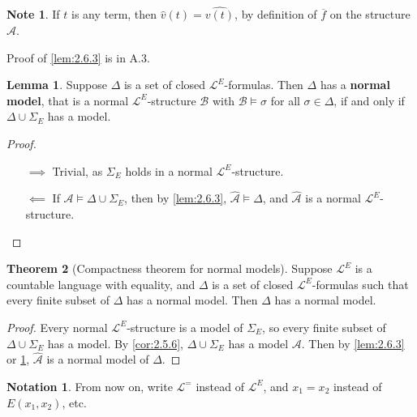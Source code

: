 \documentclass{article}
\newcommand{\A}{\mathcal{A}}
\newcommand{\B}{\mathcal{B}}
\renewcommand{\L}{\mathcal{L}}
\newcommand{\rb}[1]{\left( #1 \right)}
\theoremstyle{definition}\newtheorem{definition}{Definition}[subsection]
\theoremstyle{definition}\newtheorem{remark1}[definition]{Remark}
\theoremstyle{definition}\newtheorem{example1}[definition]{Example}
\theoremstyle{definition}\newtheorem*{remark2}{Remark}
\theoremstyle{definition}\newtheorem*{example2}{Example}
\theoremstyle{definition}\newtheorem*{note}{Note}
\theoremstyle{definition}\newtheorem*{notation}{Notation}
\newtheorem{lemma}[definition]{Lemma}
\newtheorem{theorem}[definition]{Theorem}
\begin{document}
\begin{note}
If $ t $ is any term, then $ \widehat{v}\rb{t} = \widehat{v\rb{t}} $, by definition of $ \overline{f} $ on the structure $ \widehat{\A} $.
\end{note}

Proof of \ref{lem:2.6.3} is in A.3.

\begin{lemma}
\label{lem:2.6.4}
Suppose $ \Delta $ is a set of closed $ \L^E $-formulas. Then $ \Delta $ has a \textbf{normal model}, that is a normal $ \L^E $-structure $ \B $ with $ \B \vDash \sigma $ for all $ \sigma \in \Delta $, if and only if $ \Delta \cup \Sigma_E $ has a model.
\end{lemma}

\begin{proof}
\hfill
\begin{itemize}
\item[$ \implies $] Trivial, as $ \Sigma_E $ holds in a normal $ \L^E $-structure.
\item[$ \impliedby $] If $ \A \vDash \Delta \cup \Sigma_E $, then by \ref{lem:2.6.3}, $ \widehat{\A} \vDash \Delta $, and $ \widehat{\A} $ is a normal $ \L^E $-structure.
\end{itemize}
\end{proof}

\begin{theorem}[Compactness theorem for normal models]
Suppose $ \L^E $ is a countable language with equality, and $ \Delta $ is a set of closed $ \L^E $-formulas such that every finite subset of $ \Delta $ has a normal model. Then $ \Delta $ has a normal model.
\end{theorem}

\begin{proof}
Every normal $ \L^E $-structure is a model of $ \Sigma_E $, so every finite subset of $ \Delta \cup \Sigma_E $ has a model. By \ref{cor:2.5.6}, $ \Delta \cup \Sigma_E $ has a model $ \A $. Then by \ref{lem:2.6.3} or \ref{lem:2.6.4}, $ \widehat{\A} $ is a normal model of $ \Delta $.
\end{proof}

\begin{notation}
From now on, write $ \L^= $ instead of $ \L^E $, and $ x_1 = x_2 $ instead of $ E\rb{x_1, x_2} $, etc.
\end{notation}

\pagebreak

\end{document}
